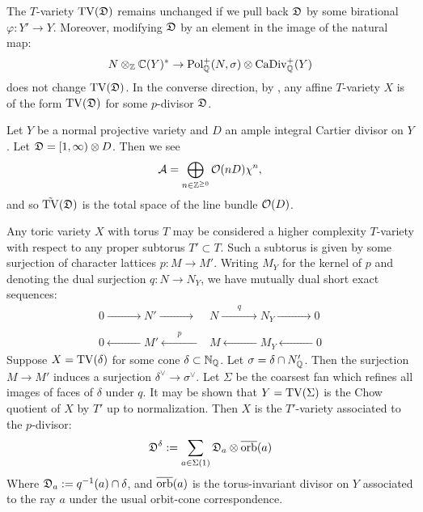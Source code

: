 The \(T\)-variety \(\operatorname{TV}({\mathfrak{D}})\) remains unchanged if we pull back \({\mathfrak{D}}\) by some birational \(\varphi: Y' \to Y\). Moreover, modifying \({\mathfrak{D}}\) by an element in the image of the natural map:
\[
N \otimes_{\mathbb{Z}} \mathbb{C}(Y)^* \to \operatorname{Pol}_{\mathbb{Q}}^+(N,\sigma) \otimes \operatorname{CaDiv}_{\mathbb{Q}}^+(Y)
\]
does not change \(\operatorname{TV}({\mathfrak{D}})\). In the converse direction, by \cite[Proposition 3.4]{hausen2018torus}, any affine \(T\)-variety \(X\) is of the form \(\operatorname{TV}({\mathfrak{D}})\) for some \(p\)-divisor \({\mathfrak{D}}\).
\begin{example}
Let \(Y\) be a normal projective variety and \(D\) an ample integral Cartier divisor on \(Y\). Let \({\mathfrak{D}} = [1,\infty) \otimes D\). Then we see
\[
\mathcal{A} = \bigoplus_{n \in \mathbb{Z}^{\ge 0}} \mathcal{O} (n D) \chi^n,
\]
and so \(\tilde{\operatorname{TV}}({\mathfrak{D}})\) is the total space of the line bundle \(\mathcal{O}(D)\).
\end{example}
\begin{example}
Any toric variety \(X\) with torus \(T\) may be considered a higher complexity \(T\)-variety with respect to any proper subtorus \(T' \subset T\). Such a subtorus is given by some surjection of character lattices \(p: M \to M'\). Writing \(M_Y\) for the kernel of \(p\) and denoting the dual surjection \(q:N \to N_Y\), we have mutually dual short exact sequences:
\begin{align*}
0 \xrightarrow{\qquad \ \qquad} N' \xrightarrow{\qquad \ \qquad}&N \xrightarrow{\qquad q \qquad} N_Y \xrightarrow{\qquad \ \qquad} 0 \\ &\ \\
0 \xleftarrow{\qquad \ \qquad} M' \xleftarrow{\qquad p \qquad}&M \xleftarrow{\qquad \ \qquad} M_Y \xleftarrow{\qquad \ \qquad} 0
\end{align*}
Suppose \(X = \operatorname{TV}(\delta)\) for some cone \(\delta \subset \mathbb{N}_{\mathbb{Q}}\). Let \(\sigma = \delta \cap N'_{\mathbb{Q}}\). Then the surjection \(M \to M'\) induces a surjection \(\delta^\vee \to \sigma^\vee\). Let \(\Sigma\) be the coarsest fan which refines all images of faces of \(\delta\) under \(q\). It may be shown that \(Y = \operatorname{TV}(\Sigma)\) is the Chow quotient of \(X\) by \(T'\) up to normalization. Then \(X\) is the \(T'\)-variety associated to the \(p\)-divisor:
\[
{\mathfrak{D}}^\delta := \sum_{a \in \Sigma(1)}  {\mathfrak{D}}_a \otimes \overline{\operatorname{orb}}(a)
\]
Where \({\mathfrak{D}}_a := q^{-1}(a) \cap \delta\), and \(\overline{\operatorname{orb}}(a)\) is the torus-invariant divisor on \(Y\) associated to the ray \(a\) under the usual orbit-cone correspondence.
\end{example}
